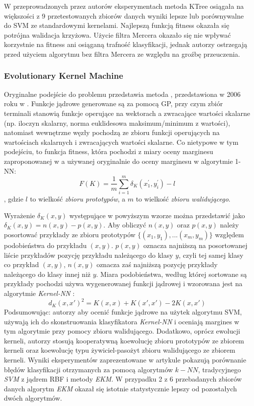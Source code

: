 W przeprowadzonych przez autorów eksperymentach metoda KTree osiągała na większości z 9 przetestowanych zbiorów danych wyniki lepsze lub porównywalne do SVM ze standardowymi kernelami. Najlepszą funkcją fitness okazała się potrójna walidacja krzyżowa. Użycie filtra Mercera okazało się nie wpływać korzystnie na fitness ani osiąganą trafność klasyfikacji, jednak autorzy ostrzegają przed użyciem algorytmu bez filtra Mercera ze względu na groźbę przeuczenia.

\subsubsection{Evolutionary Kernel Machine}
Oryginalne podejście do problemu przedstawia metoda , przedstawiona w 2006 roku w \cite{gagne_genetic_2006}. Funkcje jądrowe generowane są za pomocą GP, przy czym zbiór terminali stanowią funkcje operujące na wektorach a zwracające wartości skalarne (np. iloczyn skalarny, norma euklidesowa maksimum/minimum z wartości), natomiast wewnętrzne węzły pochodzą ze zbioru funkcji operujących na wartościach skalarnych i zwracających wartości skalarne. Co nietypowe w tym podejściu, to funkcja fitness, która pochodzi z miary oceny marginesu zaproponowanej w \cite{Gilad-Bachrach:2004:MBF:1015330.1015352} a używanej oryginalnie do oceny marginesu w algorytmie 1-NN:
$$ F(K) = \frac{1}{m} \sum_{i=1}^m \delta_K(x_1^{'}, y_i^{'}) - l $$,
gdzie $l$ to wielkość \emph{zbioru prototypów}, a $m$ to wielkość \emph{zbioru walidującego}.

Wyrażenie $ \delta_K(x,y) $ występujące w powyższym wzorze można przedstawić jako $ \delta_K(x,y) = n(x,y) - p(x,y) $. Aby obliczyć $n(x,y)$ oraz $p(x,y)$ należy posortować przykłady ze zbioru prototypów $\{(x_1,y_1),...(x_m, y_m)\}$ względem podobieństwa do przykładu $(x, y)$. $p(x,y)$ oznacza najniższą na posortowanej liście przykładów pozycję przykładu należącego do klasy $y$, czyli tej samej klasy co przykład $(x,y)$, $n(x,y)$ oznacza zaś najniższą pozycję przykłady należącego do klasy innej niż $y$.
Miara podobieństwa, według której sortowane są przykłady pochodzi używa wygenerowanej funkcji jądrowej i wzorowana jest na algorytmie \emph{Kernel-NN} \cite{Yu:2002:KNA:607789.607852}:
$$ d_K(x, x')^2 = K(x, x) + K(x', x') - 2K(x, x') $$
Podsumowując: autorzy aby ocenić funkcje jądrowe na użytek algorytmu SVM, używają ich do skonstruowania klasyfikatora \emph{Kernel-NN} i oceniają margines w tym algorytmie przy pomocy zbioru walidującego.
Dodatkowo, oprócz ewolucji kerneli, autorzy stosują kooperatywną koewolucję zbioru prototypów ze zbiorem kerneli oraz koewolucję typu żywiciel-pasożyt zbioru walidującego ze zbiorem kerneli.
Wyniki eksperymentów zaprezentowane w artykule pokazują porównanie błędów klasyfikacji otrzymanych za pomocą algorytmów $ k-NN $, tradycyjnego \emph{SVM} z jądrem RBF i metody \emph{EKM}. W przypadku 2 z 6 przebadanych zbiorów danych algorytm \emph{EKM} okazał się istotnie statystycznie lepszy od pozostałych dwóch algorytmów.

